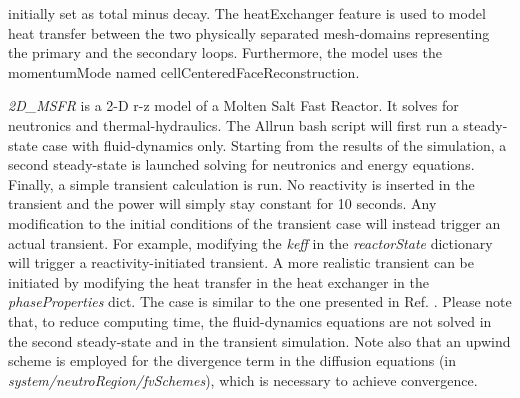 \begin{DoxyItemize}
initially set as total minus decay. The heat\+Exchanger feature is used to model heat transfer between the two physically separated mesh-\/domains representing the primary and the secondary loops. Furthermore, the model uses the momentum\+Mode named cell\+Centered\+Face\+Reconstruction.
\item {\itshape 2\+D\+\_\+\+M\+S\+FR} is a 2-\/D r-\/z model of a Molten Salt Fast Reactor. It solves for neutronics and thermal-\/hydraulics. The Allrun bash script will first run a steady-\/state case with fluid-\/dynamics only. Starting from the results of the simulation, a second steady-\/state is launched solving for neutronics and energy equations. Finally, a simple transient calculation is run. No reactivity is inserted in the transient and the power will simply stay constant for 10 seconds. Any modification to the initial conditions of the transient case will instead trigger an actual transient. For example, modifying the {\itshape keff} in the {\itshape reactor\+State} dictionary will trigger a reactivity-\/initiated transient. A more realistic transient can be initiated by modifying the heat transfer in the heat exchanger in the {\itshape phase\+Properties} dict. The case is similar to the one presented in Ref. \cite{refId0} . Please note that, to reduce computing time, the fluid-\/dynamics equations are not solved in the second steady-\/state and in the transient simulation. Note also that an upwind scheme is employed for the divergence term in the diffusion equations (in {\itshape system/neutro\+Region/fv\+Schemes}), which is necessary to achieve convergence.

\end{DoxyItemize}
